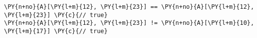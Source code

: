 \begin{Verbatim}[commandchars=\\\{\}]
\PY{n+no}{A}[\PY{l+m}{12}, \PY{l+m}{23}] == \PY{n+no}{A}[\PY{l+m}{12}, \PY{l+m}{23}] \PY{c}{// true}
\PY{n+no}{A}[\PY{l+m}{12}, \PY{l+m}{23}] != \PY{n+no}{A}[\PY{l+m}{10}, \PY{l+m}{17}] \PY{c}{// true}
\end{Verbatim}
